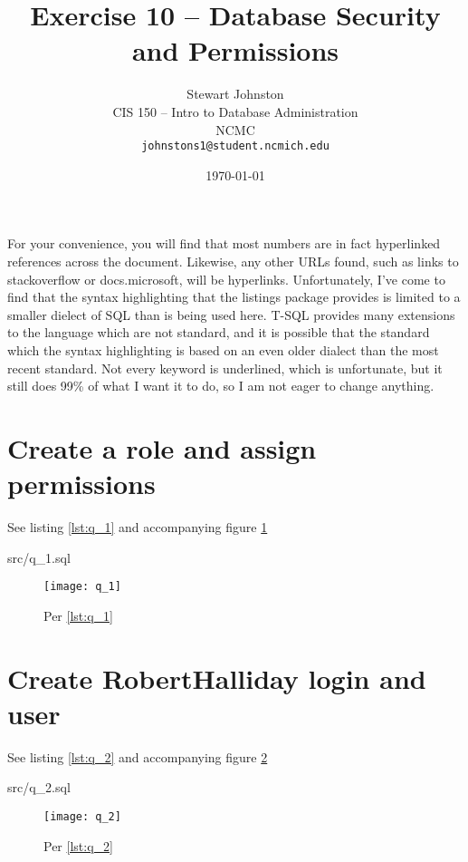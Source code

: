 \documentclass{article}
\title{Exercise 10 -- Database Security and Permissions}
\author{Stewart Johnston\\
  {CIS 150 -- Intro to Database Administration}\\
  {NCMC}\\
  {\texttt{johnstons1@student.ncmich.edu}}
}
\date{\today}
\begin{document}

\maketitle

For your convenience, you will find that most numbers are in fact
hyperlinked references across the document. Likewise, any other URLs
found, such as links to stackoverflow or docs.microsoft, will be
hyperlinks. Unfortunately, I've come to find that the syntax
highlighting that the listings package provides is limited to a smaller
dielect of SQL than is being used here. T-SQL provides many extensions
to the language which are not standard, and it is possible that the
standard which the syntax highlighting is based on an even older dialect
than the most recent standard. Not every keyword is underlined, which is
unfortunate, but it still does 99\% of what I want it to do, so I am not
eager to change anything.

\tableofcontents
\listoffigures

\section{Create a role and assign permissions}
See listing \ref{lst:q_1} and accompanying figure \ref{fig:q_1}
\label{sec:q_1}
\begin{lstinputlisting}[float, label={lst:q_1}, caption={Per
	\ref{sec:q_1}}]{src/q_1.sql}
\end{lstinputlisting}
\begin{figure}[H]\centering
	\caption{Per \ref{lst:q_1}}
	\texttt{[image: q\_1]}
	\label{fig:q_1}
\end{figure}

\section{Create RobertHalliday login and user}
See listing \ref{lst:q_2} and accompanying figure \ref{fig:q_2}
\label{sec:q_2}
\begin{lstinputlisting}[float, label={lst:q_2}, caption={Per
	\ref{sec:q_2}}]{src/q_2.sql}
\end{lstinputlisting}
\begin{figure}[H]\centering
	\caption{Per \ref{lst:q_2}}
	\texttt{[image: q\_2]}
	\label{fig:q_2}
\end{figure}
\end{document}
